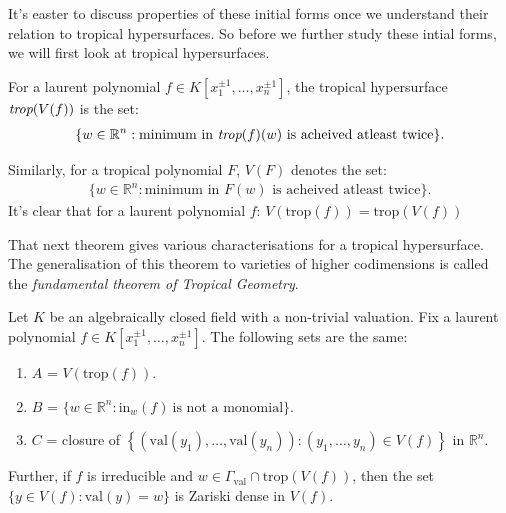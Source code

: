     It's easter to discuss properties of these initial forms once we understand their relation to tropical hypersurfaces.
    So before we further study these intial forms, we will first look at tropical hypersurfaces.
    \begin{definition}
        For a laurent polynomial $f \in  K[x_{1}^{\pm1}, \dots, x_{n}^{\pm1}] $, the tropical hypersurface $\emph{trop}(V(f))$ is the set:
        \begin{align*}
        \{w \in \mathbb{R}^{n}: \text{minimum in }\emph{trop}(f)(w)\text{ is acheived atleast twice}\}.
        \end{align*}
    \end{definition}
    Similarly, for a tropical polynomial $F$, $V(F)$ denotes the set:
    \begin{align*}
        \{w \in \mathbb{R}^{n}: \text{minimum in }F(w)\text{ is acheived atleast twice}\}.
    \end{align*}
    It's clear that for a laurent polynomial $f$: $V(\text{trop}(f)) = \text{trop}(V(f))$

    That next theorem gives various characterisations for a tropical hypersurface.
    The generalisation of this theorem to varieties of higher codimensions is called the \textit{fundamental theorem of Tropical Geometry}.
    \begin{theorem}
    Let $K$ be an algebraically closed field with a non-trivial valuation. Fix a laurent polynomial $f \in K[x_{1}^{\pm1}, \dots, x_{n}^{\pm1}]$. The following sets are the same:
    \begin{enumerate}
        \item $A$ = $V(\text{trop}(f))$.
        \item $B$ = $\{w \in \mathbb{R}^{n}: \text{in}_{w}(f)~ \text{is not a monomial}\}$.
        \item $C$ = closure of $\left\{(\text{val}(y_1), \dots, \text{val}(y_n)): (y_1,\dots, y_n) \in V(f)\right\}$ in $\mathbb{R}^{n}$.
    \end{enumerate}
    Further, if $f$ is irreducible and $w \in \Gamma_{\text{val}} \cap \text{trop}(V(f))$, then the set $\{y \in V(f): \text{val}(y) = w\}$ is Zariski dense in $V(f)$.
    \end{theorem}

